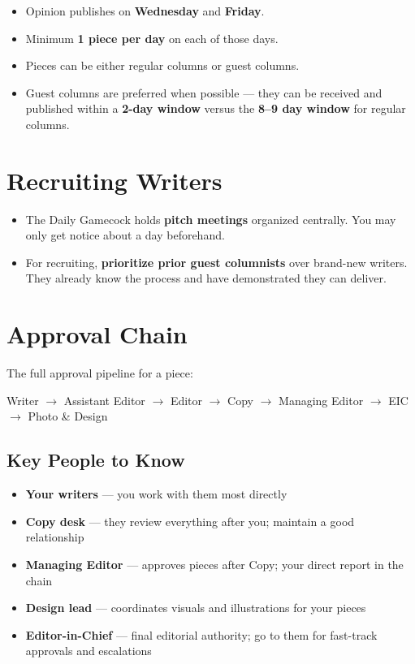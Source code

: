 \documentclass[12pt]{article}
\begin{document}
\begin{itemize}
    \item Opinion publishes on \textbf{Wednesday} and \textbf{Friday}.
    \item Minimum \textbf{1 piece per day} on each of those days.
    \item Pieces can be either regular columns or guest columns.
    \item Guest columns are preferred when possible --- they can be received and published within a \textbf{2-day window} versus the \textbf{8--9 day window} for regular columns.
\end{itemize}

\section{Recruiting Writers}

\begin{itemize}
    \item The Daily Gamecock holds \textbf{pitch meetings} organized centrally. You may only get notice about a day beforehand.
    \item For recruiting, \textbf{prioritize prior guest columnists} over brand-new writers. They already know the process and have demonstrated they can deliver.
\end{itemize}

\section{Approval Chain}

The full approval pipeline for a piece:

\begin{center}
Writer $\rightarrow$ Assistant Editor $\rightarrow$ Editor $\rightarrow$ Copy $\rightarrow$ Managing Editor $\rightarrow$ EIC $\rightarrow$ Photo \& Design
\end{center}

\subsection{Key People to Know}

\begin{itemize}
    \item \textbf{Your writers} --- you work with them most directly
    \item \textbf{Copy desk} --- they review everything after you; maintain a good relationship
    \item \textbf{Managing Editor} --- approves pieces after Copy; your direct report in the chain
    \item \textbf{Design lead} --- coordinates visuals and illustrations for your pieces
    \item \textbf{Editor-in-Chief} --- final editorial authority; go to them for fast-track approvals and escalations
\end{itemize}
\end{document}
